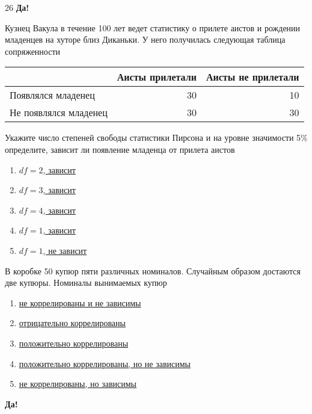 \documentclass[t]{beamer}
\begin{document}
 \begin{frame} \label{26-Yes} 
\begin{block}{26  \textbf{Да!} \hyperlink{27}{}} 

   Кузнец Вакула в течение 100 лет ведет статистику о прилете аистов и рождении младенцев на хуторе близ Диканьки. У него получилась следующая таблица сопряженности

\begin{center}
\begin{tabular}{lrr} \toprule
& Аисты прилетали  & Аисты не прилетали \\
\midrule
Появлялся младенец & 30 & 10 \\
Не появлялся младенец & 30 & 30 \\
\bottomrule
\end{tabular}
\end{center}

Укажите число степеней свободы статистики Пирсона и на уровне значимости 5\% определите, зависит ли появление младенца от прилета аистов

  


 \end{block} 
\begin{enumerate} 
\item[] \hyperlink{26-No}{\beamergotobutton{} $df=2$, зависит}
\item[] \hyperlink{26-No}{\beamergotobutton{} $df=3$, зависит}
\item[] \hyperlink{26-No}{\beamergotobutton{} $df=4$, зависит}
\item[] \hyperlink{26-Yes}{\beamergotobutton{} $df=1$, зависит}
\item[] \hyperlink{26-No}{\beamergotobutton{} $df=1$, не зависит}
\end{enumerate} 

\end{frame} 


 \begin{frame} \label{27-Yes} 
\begin{block}{27} 

  В коробке 50 купюр пяти различных номиналов. Случайным образом достаются две купюры. Номиналы вынимаемых купюр
  


 \end{block} 
\begin{enumerate} 
\item[] \hyperlink{27-No}{\beamergotobutton{} не коррелированы и не зависимы}
\item[] \hyperlink{27-Yes}{\beamergotobutton{} отрицательно коррелированы}
\item[] \hyperlink{27-No}{\beamergotobutton{} положительно коррелированы}
\item[] \hyperlink{27-No}{\beamergotobutton{} положительно коррелированы, но не зависимы}
\item[] \hyperlink{27-No}{\beamergotobutton{} не коррелированы, но зависимы}
\end{enumerate} 

 \textbf{Да!} 
 \hyperlink{28}{}\end{frame} 
\end{document}
